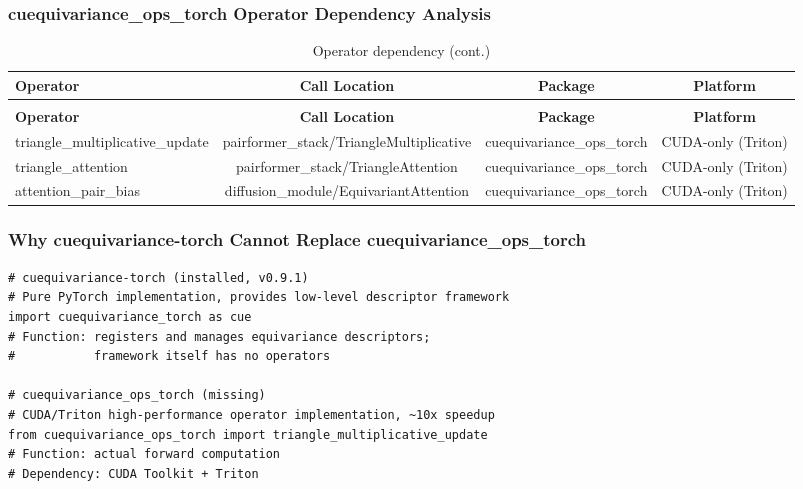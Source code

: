 \documentclass[12pt,a4paper]{article}
\begin{document}
\subsubsection{cuequivariance_ops_torch Operator Dependency Analysis}

\begin{longtable}{lccc}
    \caption{cuequivariance_ops_torch Operator Dependency Analysis} \\
    \toprule
    \textbf{Operator} & \textbf{Call Location} & \textbf{Package} & \textbf{Platform} \\
    \midrule
    \endfirsthead
    \caption[]{Operator dependency (cont.)} \\
    \toprule
    \textbf{Operator} & \textbf{Call Location} & \textbf{Package} & \textbf{Platform} \\
    \midrule
    \endhead
    \bottomrule
    \endfoot
    \endlastfoot

    triangle_multiplicative_update
        & pairformer_stack/TriangleMultiplicative
        & cuequivariance_ops_torch
        & CUDA-only (Triton) \\
    triangle_attention
        & pairformer_stack/TriangleAttention
        & cuequivariance_ops_torch
        & CUDA-only (Triton) \\
    attention_pair_bias
        & diffusion_module/EquivariantAttention
        & cuequivariance_ops_torch
        & CUDA-only (Triton) \\
    \bottomrule
\end{longtable}

\subsubsection{Why cuequivariance-torch Cannot Replace cuequivariance_ops_torch}

\begin{verbatim}
# cuequivariance-torch (installed, v0.9.1)
# Pure PyTorch implementation, provides low-level descriptor framework
import cuequivariance_torch as cue
# Function: registers and manages equivariance descriptors;
#           framework itself has no operators

# cuequivariance_ops_torch (missing)
# CUDA/Triton high-performance operator implementation, ~10x speedup
from cuequivariance_ops_torch import triangle_multiplicative_update
# Function: actual forward computation
# Dependency: CUDA Toolkit + Triton
\end{verbatim}
\end{document}
